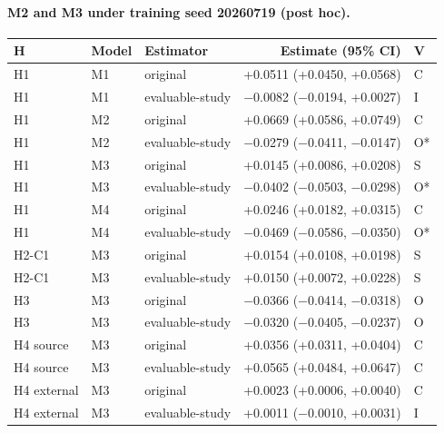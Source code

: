 \paragraph{M2 and M3 under training seed 20260719 (post hoc).}
\begin{center}\small\begin{tabular}{lllrl}
\toprule
H & Model & Estimator & Estimate (95\% CI) & V\\
\midrule
H1 & M1 & original & +0.0511 (+0.0450, +0.0568) & C\\
H1 & M1 & evaluable-study & $-$0.0082 ($-$0.0194, +0.0027) & I\\
H1 & M2 & original & +0.0669 (+0.0586, +0.0749) & C\\
H1 & M2 & evaluable-study & $-$0.0279 ($-$0.0411, $-$0.0147) & O*\\
H1 & M3 & original & +0.0145 (+0.0086, +0.0208) & S\\
H1 & M3 & evaluable-study & $-$0.0402 ($-$0.0503, $-$0.0298) & O*\\
H1 & M4 & original & +0.0246 (+0.0182, +0.0315) & C\\
H1 & M4 & evaluable-study & $-$0.0469 ($-$0.0586, $-$0.0350) & O*\\
H2-C1 & M3 & original & +0.0154 (+0.0108, +0.0198) & S\\
H2-C1 & M3 & evaluable-study & +0.0150 (+0.0072, +0.0228) & S\\
H3 & M3 & original & $-$0.0366 ($-$0.0414, $-$0.0318) & O\\
H3 & M3 & evaluable-study & $-$0.0320 ($-$0.0405, $-$0.0237) & O\\
H4 source & M3 & original & +0.0356 (+0.0311, +0.0404) & C\\
H4 source & M3 & evaluable-study & +0.0565 (+0.0484, +0.0647) & C\\
H4 external & M3 & original & +0.0023 (+0.0006, +0.0040) & C\\
H4 external & M3 & evaluable-study & +0.0011 ($-$0.0010, +0.0031) & I\\
\bottomrule
\end{tabular}\end{center}
